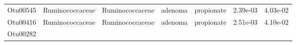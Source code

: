 \documentclass[11pt,]{article}
\begin{document}
\begin{longtable}[]{@{}ccccccc@{}}
\begin{minipage}[t]{0.09\columnwidth}\centering\strut
Otu00545\strut
\end{minipage} & \begin{minipage}[t]{0.17\columnwidth}\centering\strut
Ruminococcaceae\strut
\end{minipage} & \begin{minipage}[t]{0.17\columnwidth}\centering\strut
Ruminococcaceae\strut
\end{minipage} & \begin{minipage}[t]{0.09\columnwidth}\centering\strut
adenoma\strut
\end{minipage} & \begin{minipage}[t]{0.11\columnwidth}\centering\strut
propionate\strut
\end{minipage} & \begin{minipage}[t]{0.09\columnwidth}\centering\strut
2.39e-03\strut
\end{minipage} & \begin{minipage}[t]{0.09\columnwidth}\centering\strut
4.03e-02\strut
\end{minipage}\tabularnewline
\begin{minipage}[t]{0.09\columnwidth}\centering\strut
Otu00416\strut
\end{minipage} & \begin{minipage}[t]{0.17\columnwidth}\centering\strut
Ruminococcaceae\strut
\end{minipage} & \begin{minipage}[t]{0.17\columnwidth}\centering\strut
Ruminococcaceae\strut
\end{minipage} & \begin{minipage}[t]{0.09\columnwidth}\centering\strut
adenoma\strut
\end{minipage} & \begin{minipage}[t]{0.11\columnwidth}\centering\strut
propionate\strut
\end{minipage} & \begin{minipage}[t]{0.09\columnwidth}\centering\strut
2.51e-03\strut
\end{minipage} & \begin{minipage}[t]{0.09\columnwidth}\centering\strut
4.10e-02\strut
\end{minipage}\tabularnewline
\begin{minipage}[t]{0.09\columnwidth}\centering\strut
Otu00282\strut
\end{minipage} & \begin{minipage}[t]{0.17\columnwidth}\centering\strut

\end{minipage}
\end{longtable}
\end{document}
